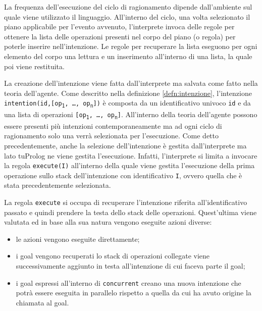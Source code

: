 La frequenza dell'esecuzione del ciclo di ragionamento dipende dall'ambiente sul quale viene utilizzato il linguaggio. All'interno del ciclo, una volta selezionato il piano applicabile per l'evento avvenuto, l'interprete invoca delle regole per ottenere la lista delle operazioni presenti nel corpo del piano (o regola) per poterle inserire nell'intenzione. Le regole per recuperare la lista eseguono per ogni elemento del corpo una lettura e un inserimento all'interno di una lista, la quale poi viene restituita.

La creazione dell'intenzione viene fatta dall'interprete ma salvata come fatto nella teoria dell'agente. Come descritto nella definizione \ref{defn:intenzione}, l'intenzione \texttt{in\-ten\-tion(id,[op\textsubscript{1}, \ldots, op\textsubscript{n}])} è composta da un identificativo univoco \texttt{id} e da una lista di operazioni \texttt{[op\textsubscript{1}, \ldots, op\textsubscript{n}]}. All'interno della teoria dell'agente possono essere presenti più intenzioni contemporaneamente ma ad ogni ciclo di ragionamento solo una verrà selezionata per l'esecuzione.
Come detto precedentemente, anche la selezione dell'intenzione è gestita dall'interprete ma lato tuProlog ne viene gestita l'esecuzione. Infatti, l'interprete si limita a invocare la regola \texttt{execute(I)} all'interno della quale viene gestita l'esecuzione della prima operazione sullo stack dell'intenzione con identificativo \texttt{I}, ovvero quella che è stata precedentemente selezionata.

La regola \texttt{execute} si occupa di recuperare l'intenzione riferita all'identificativo passato e quindi prendere la testa dello stack delle operazioni. Quest'ultima viene valutata ed in base alla sua natura vengono eseguite azioni diverse:
\begin{itemize}
\item le azioni vengono eseguite direttamente;
\item i goal vengono recuperati lo stack di operazioni collegate viene successivamente aggiunto in testa all'intenzione di cui faceva parte il goal;
\item i goal espressi all'interno di \texttt{concurrent} creano una nuova intenzione che potrà essere eseguita in parallelo rispetto a quella da cui ha avuto origine la chiamata al goal.
\end{itemize}


